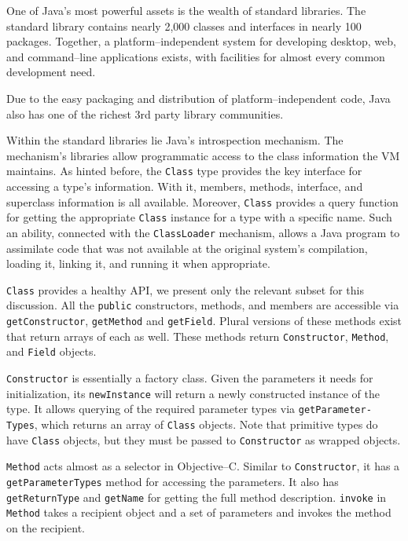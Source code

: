 One of Java's most powerful assets is the wealth of standard libraries. The
standard library contains nearly 2,000 classes and interfaces in nearly 100
packages. Together, a platform--independent system for developing desktop,
web, and command--line applications exists, with facilities for almost every
common development need.

Due to the easy packaging and distribution of platform--independent code, Java
also has one of the richest 3rd party library communities.

Within the standard libraries lie Java's introspection mechanism. The
mechanism's libraries allow programmatic access to the class information the
VM maintains. As hinted before, the \texttt{Class} type provides the key
interface for accessing a type's information. With it, members, methods,
interface, and superclass information is all available. Moreover,
\texttt{Class} provides a query function for getting the appropriate
\texttt{Class} instance for a type with a specific name. Such an ability,
connected with the \texttt{ClassLoader} mechanism, allows a Java program to
assimilate code that was not available at the original system's compilation,
loading it, linking it, and running it when appropriate.

\texttt{Class} provides a healthy API, we present only the relevant subset for
this discussion. All the \texttt{public} constructors, methods, and members
are accessible via \texttt{getConstructor}, \texttt{getMethod} and
\texttt{getField}. Plural versions of these methods exist that return arrays
of each as well. These methods return \texttt{Constructor}, \texttt{Method},
and \texttt{Field} objects.

\texttt{Constructor} is essentially a factory class. Given the parameters it
needs for initialization, its \texttt{newInstance} will return a newly
constructed instance of the type. It allows querying of the required parameter
types via \texttt{get\-P\-ar\-am\-et\-er-\-T\-yp\-es}, which returns an array
of \texttt{Class} objects. Note that primitive types do have \texttt{Class}
objects, but they must be passed to \texttt{Constructor} as wrapped objects.

\texttt{Method} acts almost as a selector in Objective--C. Similar to
\texttt{Constructor}, it has a \texttt{get\-Par\-am\-et\-er\-T\-yp\-es} method
for accessing the parameters. It also has \texttt{getReturnType} and
\texttt{getName} for getting the full method description. \texttt{invoke} in
\texttt{Method} takes a recipient object and a set of parameters and invokes
the method on the recipient.

